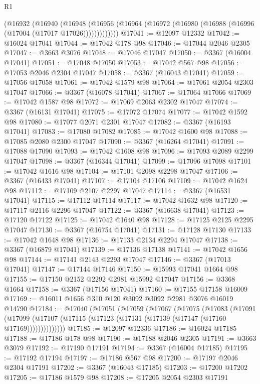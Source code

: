 \begin{lexlean}{R1}
\begin{coremodule}
        (@16932
          (@16940
            (@16948
              (@16956 (@16964 (@16972 (@16980 (@16988 (@16996 (@17004 (@17017 @17026)))))))))))))
@17041 := @12097 @12332
@17042 := @16024 @17041
@17044 := @17042 @178 @98
@17046 := @17044 @2046 @2305
@17047 := @3663 @3076
@17048 := @17046 @17047
@17050 := @3367 (@16004 @17041)
@17051 := @17048 @17050
@17053 := @17042 @567 @98
@17056 := @17053 @2046 @2304 @17047
@17058 := @3367 (@16043 @17041)
@17059 := @17056 @17058
@17061 := @17042 @1579 @98
@17064 := @17061 @2054 @2303 @17047
@17066 := @3367 (@16078 @17041)
@17067 := @17064 @17066
@17069 := @17042 @1587 @98
@17072 := @17069 @2063 @2302 @17047
@17074 := @3367 (@16131 @17041)
@17075 := @17072 @17074
@17077 := @17042 @1592 @98
@17080 := @17077 @2071 @2301 @17047
@17082 := @3367 (@16193 @17041)
@17083 := @17080 @17082
@17085 := @17042 @1600 @98
@17088 := @17085 @2080 @2300 @17047
@17090 := @3367 (@16264 @17041)
@17091 := @17088 @17090
@17093 := @17042 @1608 @98
@17096 := @17093 @2089 @2299 @17047
@17098 := @3367 (@16344 @17041)
@17099 := @17096 @17098
@17101 := @17042 @1616 @98
@17104 := @17101 @2098 @2298 @17047
@17106 := @3367 (@16433 @17041)
@17107 := @17104 @17106
@17109 := @17042 @1624 @98
@17112 := @17109 @2107 @2297 @17047
@17114 := @3367 (@16531 @17041)
@17115 := @17112 @17114
@17117 := @17042 @1632 @98
@17120 := @17117 @2116 @2296 @17047
@17122 := @3367 (@16638 @17041)
@17123 := @17120 @17122
@17125 := @17042 @1640 @98
@17128 := @17125 @2125 @2295 @17047
@17130 := @3367 (@16754 @17041)
@17131 := @17128 @17130
@17133 := @17042 @1648 @98
@17136 := @17133 @2134 @2294 @17047
@17138 := @3367 (@16879 @17041)
@17139 := @17136 @17138
@17141 := @17042 @1656 @98
@17144 := @17141 @2143 @2293 @17047
@17146 := @3367 (@17013 @17041)
@17147 := @17144 @17146
@17150 := @15993 @17041 @1664 @98
@17155 := @17150 @2152 @2292 @2981 @15992 @17047
@17156 := @3368 @1664
@17158 := @3367 (@17156 @17041)
@17160 := @17155 @17158 @16009
@17169 := @16011 @1656 @310 @120 @3092 @3092 @2981 @3076 @16019 @14790
@17184 := @17040
    (@17051
      (@17059
        (@17067
          (@17075
            (@17083
              (@17091
                (@17099 (@17107 (@17115 (@17123 (@17131 (@17139 (@17147 (@17160 @17169))))))))))))))
@17185 := @12097 @12336
@17186 := @16024 @17185
@17188 := @17186 @178 @98
@17190 := @17188 @2046 @2305
@17191 := @3663 @3079
@17192 := @17190 @17191
@17194 := @3367 (@16004 @17185)
@17195 := @17192 @17194
@17197 := @17186 @567 @98
@17200 := @17197 @2046 @2304 @17191
@17202 := @3367 (@16043 @17185)
@17203 := @17200 @17202
@17205 := @17186 @1579 @98
@17208 := @17205 @2054 @2303 @17191

\end{coremodule}
\end{lexlean}
